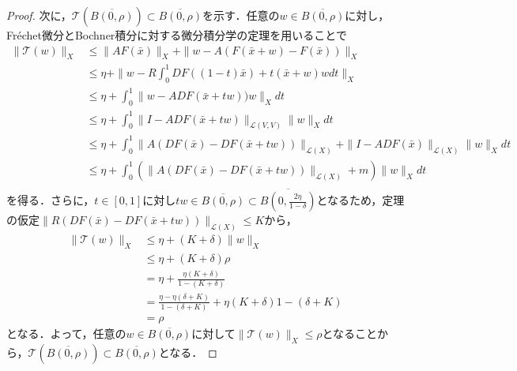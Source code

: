 \documentclass[11pt,a4paper,titlepage]{jsreport}
\theoremstyle{definition}
\begin{document}
\begin{proof}
  次に，$\mathcal{T}(\overline{B(0,\rho)}) \subset \overline{B(0,\rho)}$を示す．任意の$w\in \overline{B(0,\rho)}$に対し，Fr\'{e}chet微分とBochner積分に対する微分積分学の定理を用いることで
  \begin{align*}
    \|\mathcal{T}(w)\|_X & \leq \|AF(\bar{x})\|_X + \|w-A(F(\bar{x}+w)-F(\bar{x}))\|_X                                                             \\
                         & \leq \eta + \|w - R\int_0^1 DF((1-t)\bar{x})+t(\bar{x}+w)wdt\|_X                                                        \\
                         & \leq \eta + \int_0^1 \|w - ADF(\bar{x}+tw))w\|_X dt                                                                     \\
                         & \leq \eta + \int_0^1 \|I - ADF(\bar{x}+tw)\|_{\mathcal{L}(V,V)}\|w\|_X dt                                               \\
                         & \leq \eta + \int_0^1 \|A(DF(\bar{x})-DF(\bar{x}+tw))\|_{\mathcal{L}(X)} + \|I-ADF(\bar{x})\|_{\mathcal{L}(X)}\|w\|_X dt \\
                         & \leq \eta + \int_0^1 (\|A(DF(\bar{x})-DF(\bar{x}+tw))\|_{\mathcal{L}(X)} +m) \|w\|_{X}dt                                \\
  \end{align*}
  を得る．さらに，$t\in[0,1]$に対し$tw\in\overline{B(0,\rho)}\subset\overline{B\left(0,\frac{2\eta}{1-\delta}\right)}$となるため，定理の仮定$\|R(DF(\bar{x})-DF(\bar{x}+tw))\|_{\mathcal{L}(X)}\leq K$から，
  \begin{align*}
    \|\mathcal{T}(w)\|_X & \leq \eta + (K+\delta)\|w\|_X                                             \\
                         & \leq \eta + (K+\delta)\rho                                                \\
                         & = \eta + \frac{\eta(K+\delta)}{1-(K+\delta)}                              \\
                         & = \frac{\eta-\eta(\delta+K)}{1-(\delta+K)}+{\eta(K+\delta)}{1-(\delta+K)} \\
                         & = \rho
  \end{align*}
  となる．よって，任意の$w\in \overline{B(0,\rho)}$に対して$\|\mathcal{T}(w)\|_X \leq \rho$となることから，$\mathcal{T}\left(\overline{B(0,\rho)}\right) \subset \overline{B(0,\rho)}$となる．


\end{proof}
\end{document}
